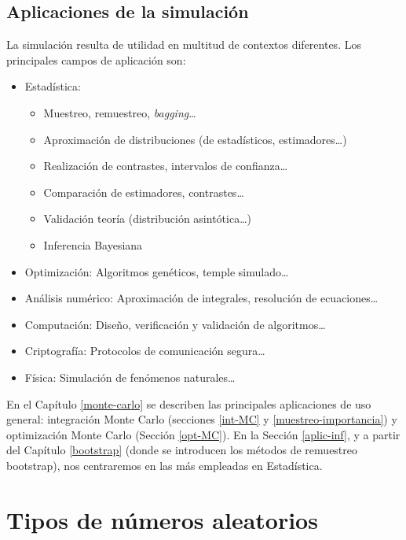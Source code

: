 \documentclass[
  10pt,
]{book}
\theoremstyle{break}
\theoremstyle{nonumberplain}
\begin{document}
\hypertarget{aplicaciones-de-la-simulaciuxf3n}{%
\subsection{Aplicaciones de la simulación}\label{aplicaciones-de-la-simulaciuxf3n}}

La simulación resulta de utilidad en multitud de contextos diferentes.
Los principales campos de aplicación son:

\begin{itemize}
\item
  Estadística:

  \begin{itemize}
  \item
    Muestreo, remuestreo, \emph{bagging}\ldots{}
  \item
    Aproximación de distribuciones (de estadísticos, estimadores\ldots)
  \item
    Realización de contrastes, intervalos de confianza\ldots{}
  \item
    Comparación de estimadores, contrastes\ldots{}
  \item
    Validación teoría (distribución asintótica\ldots)
  \item
    Inferencia Bayesiana
  \end{itemize}
\item
  Optimización: Algoritmos genéticos, temple simulado\ldots{}
\item
  Análisis numérico: Aproximación de integrales, resolución de ecuaciones\ldots{}
\item
  Computación: Diseño, verificación y validación de algoritmos\ldots{}
\item
  Criptografía: Protocolos de comunicación segura\ldots{}
\item
  Física: Simulación de fenómenos naturales\ldots{}
\end{itemize}

En el Capítulo \ref{monte-carlo} se describen las principales aplicaciones de uso general: integración Monte Carlo (secciones \ref{int-MC} y \ref{muestreo-importancia}) y optimización Monte Carlo (Sección \ref{opt-MC}).
En la Sección \ref{aplic-inf}, y a partir del Capítulo \ref{bootstrap} (donde se introducen los métodos de remuestreo bootstrap), nos centraremos en las más empleadas en Estadística.

\hypertarget{tipos-de-nuxfameros-aleatorios}{%
\section{Tipos de números aleatorios}\label{tipos-de-nuxfameros-aleatorios}}
\end{document}
